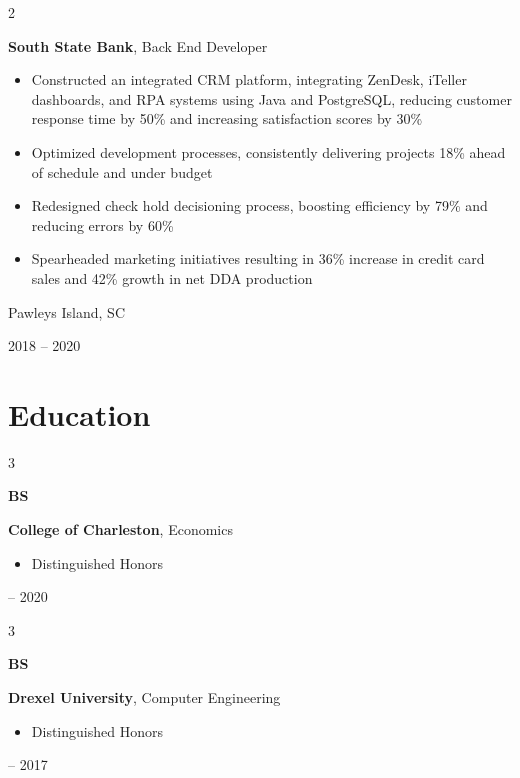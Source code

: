 \documentclass[10pt, letterpaper]{article}
\newenvironment{highlights}{
    \begin{itemize}[
        topsep=0.10 cm,
        parsep=0.10 cm,
        partopsep=0pt,
        itemsep=0pt,
        leftmargin=0.4 cm + 10pt
    ]
}{
    \end{itemize}
} %
\newenvironment{twocolentry}[2][]{
    \onecolentry
    \def\secondColumn{#2}
    \setcolumnwidth{\fill, 4.5 cm}
    \begin{paracol}{2}
}{
    \switchcolumn \raggedleft \secondColumn
    \end{paracol}
    \endonecolentry
} %
\newenvironment{threecolentry}[3][]{
    \onecolentry
    \def\thirdColumn{#3}
    \setcolumnwidth{1 cm, \fill, 4.5 cm}
    \begin{paracol}{3}
    {\raggedright #2} \switchcolumn
}{
    \switchcolumn \raggedleft \thirdColumn
    \end{paracol}
    \endonecolentry
} %
\begin{document}
        \begin{twocolentry}{
            Pawleys Island, SC

        2018 – 2020
        }
            \textbf{South State Bank}, Back End Developer
            \begin{highlights}
                \item Constructed an integrated CRM platform, integrating ZenDesk, iTeller dashboards, and RPA systems using Java and PostgreSQL, reducing customer response time by 50\% and increasing satisfaction scores by 30\%
                \item Optimized development processes, consistently delivering projects 18\% ahead of schedule and under budget
                \item Redesigned check hold decisioning process, boosting efficiency by 79\% and reducing errors by 60\%
                \item Spearheaded marketing initiatives resulting in 36\% increase in credit card sales and 42\% growth in net DDA production
            \end{highlights}
        \end{twocolentry}



    
    \section{Education}



        
        \begin{threecolentry}{\textbf{BS}}{
            2019 – 2020
        }
            \textbf{College of Charleston}, Economics
            \begin{highlights}
                \item Distinguished Honors
            \end{highlights}
        \end{threecolentry}

        \vspace{0.2 cm}

        \begin{threecolentry}{\textbf{BS}}{
            2014 – 2017
        }
            \textbf{Drexel University}, Computer Engineering
            \begin{highlights}
                \item Distinguished Honors
            \end{highlights}
        \end{threecolentry}


    
\end{document}
